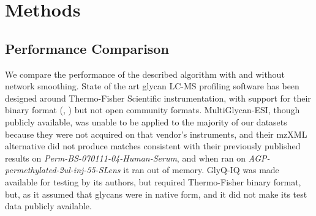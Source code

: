 \section{Methods}

% 

% 







\subsection{Performance Comparison}
    We compare the performance of the described algorithm with and without
    network smoothing. State of the art glycan LC-MS profiling software
    has been designed around Thermo-Fisher Scientific instrumentation, with
    support for their binary format (\cite{Kronewitter2014}, \cite{Yu2013})
    but not open community formats. MultiGlycan-ESI, though publicly available,
    was unable to be applied to the majority of our datasets because they were
    not acquired on that vendor's instruments, and their mzXML alternative
    did not produce matches consistent with their previously published results
    on \textit{Perm-BS-070111-04-Human-Serum}, and when ran on
    \textit{AGP-permethylated-2ul-inj-55-SLens} it ran out of memory. GlyQ-IQ
    was made available for testing by its authors, but required Thermo-Fisher
    binary format, but, as it assumed that glycans were in native form, and it
    did not make its test data publicly available.
